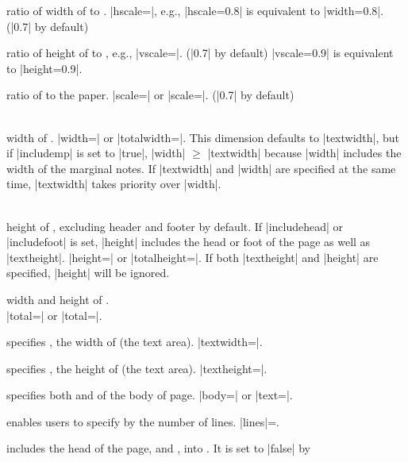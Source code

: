 \begin{Options}
\item[hscale]
   ratio of width of  to . 
   |hscale=|, e.g., |hscale=0.8| is equivalent to
   |width=0.8|. (|0.7| by default)
\item[vscale]
   ratio of height of  to , e.g.,
   |vscale=|. (|0.7| by default) |vscale=0.9| is equivalent
   to |height=0.9|.
\item[scale] ratio of  to the paper.
   |scale=| or |scale=|.
   (|0.7| by default)
\item[width\OR totalwidth] ~\\
   width of . |width=| or
   |totalwidth=|. This dimension defaults to |textwidth|,
   but if |includemp| is set to |true|, |width| $\ge$ |textwidth| 
   because |width| includes the width of the marginal notes.
   If |textwidth| and |width| are specified at the same time, 
   |textwidth| takes priority over |width|.
\item[height\OR totalheight] ~\\
   height of , excluding header and footer by default.
   If |includehead| or |includefoot| is set, |height| includes
   the head or foot of the page as well as |textheight|.
   |height=| or |totalheight=|. If both
   |textheight| and |height| are specified, |height| will be ignored.
\item[total] width and height of .\\
   |total=| or |total=|.
\item[textwidth] specifies , the width of  
   (the text area). |textwidth=|.
\item[textheight] specifies , the height of
    (the text area). |textheight=|.
\item[text\OR body] specifies both  and 
   of the body of page. |body=| or
   |text=|.
\item[lines] enables users to specify  by the number
   of lines. |lines|=.
\item[includehead] includes the head of the page, 
   and , into . It is set to |false| by

\end{Options}
